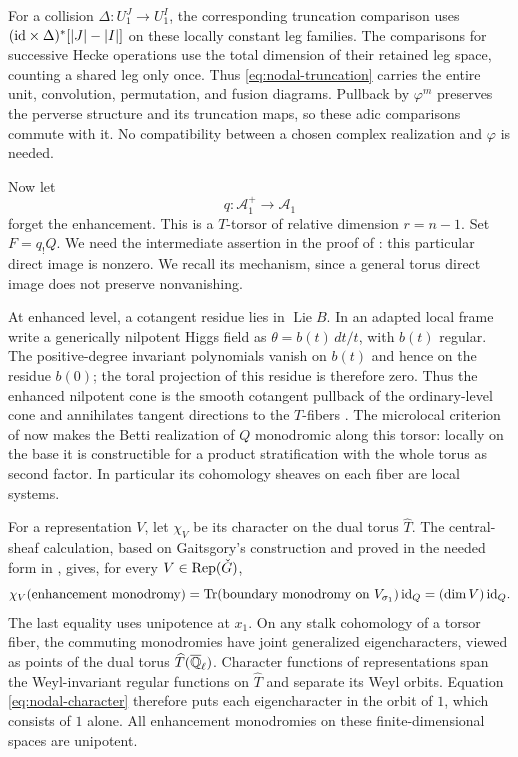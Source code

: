 For a collision $\Delta:U_1^J\to U_1^I$, the corresponding
truncation comparison uses
$(\mathrm{id}\times\Delta)^*[|J|-|I|]$ on these locally constant leg
families.  The comparisons for successive Hecke operations use the
total dimension of their retained leg space, counting a shared
leg only once.  Thus \eqref{eq:nodal-truncation} carries the entire
unit, convolution, permutation, and fusion diagrams.  Pullback by
$\varphi^m$ preserves the perverse structure and its truncation
maps, so these adic comparisons commute with it.  No compatibility
between a chosen complex realization and $\varphi$ is needed.

Now let
\[
 q:\mathcal A_1^+\longrightarrow\mathcal A_1
\]
forget the enhancement.  This is a $T$-torsor of relative dimension
$r=n-1$.  Set $F=q_!Q$.  We need the intermediate assertion in the
proof of \cite[Proposition~7.5]{CT}: this particular direct image is
nonzero.  We recall its mechanism, since a general torus direct
image does not preserve nonvanishing.

At enhanced level, a cotangent residue lies in $\operatorname{Lie}B$.
In an adapted local frame write a generically nilpotent Higgs field
as $\theta=b(t)\,dt/t$, with $b(t)$ regular.  The positive-degree
invariant polynomials vanish on $b(t)$ and hence on the residue
$b(0)$; the toral projection of this residue is therefore zero.
Thus the enhanced nilpotent cone is the smooth cotangent pullback
of the ordinary-level cone and annihilates tangent directions to
the $T$-fibers \cite[Section~3.1]{CT}.  The microlocal criterion of
\cite[Lemma~7.1]{CT} now makes the Betti realization of $Q$
monodromic along this torsor: locally on the base it is constructible
for a product stratification with the whole torus as second factor.
In particular its cohomology sheaves on each fiber are local systems.

For a representation $V$, let $\chi_V$ be its character on the
dual torus $\widehat T$.  The central-sheaf calculation, based on
Gaitsgory's construction \cite{GaitsgoryCentral} and proved in the
needed form in \cite[Lemma~7.4 and proof of Proposition~7.5]{CT},
gives, for
every $V\in\operatorname{Rep}(\check G)$,
\begin{equation}\label{eq:nodal-character}
 \chi_V(\text{enhancement monodromy})
       =\operatorname{Tr}(\text{boundary monodromy on }V_{\sigma_1})
          \,\mathrm{id}_Q
       = (\dim V)\,\mathrm{id}_Q.
\end{equation}
The last equality uses unipotence at $x_1$.  On any stalk
cohomology of a torsor fiber, the commuting monodromies have joint
generalized eigencharacters, viewed as points of the dual torus
$\widehat T(\overline{\mathbb Q}_{\ell})$.  Character functions of representations span the
Weyl-invariant regular functions on $\widehat T$ and separate its
Weyl orbits.  Equation
\eqref{eq:nodal-character} therefore puts each eigencharacter in
the orbit of $1$, which consists of $1$ alone.  All enhancement
monodromies on these finite-dimensional spaces are unipotent.

